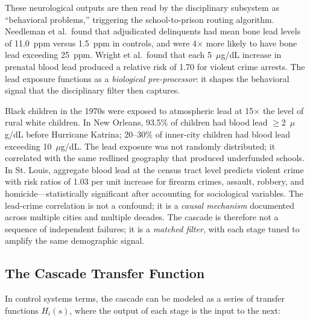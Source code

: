 These neurological outputs are then read by the disciplinary subsystem as ``behavioral problems,'' triggering the school-to-prison routing algorithm. Needleman et al.~found that adjudicated delinquents had mean bone lead levels of 11.0~ppm versus 1.5~ppm in controls, and were 4$\times$ more likely to have bone lead exceeding 25~ppm. Wright et al.~found that each 5~$\mu$g/dL increase in prenatal blood lead produced a relative risk of 1.70 for violent crime arrests. The lead exposure functions as a \textit{biological pre-processor}: it shapes the behavioral signal that the disciplinary filter then captures.

Black children in the 1970s were exposed to atmospheric lead at 15$\times$ the level of rural white children. In New Orleans, 93.5\% of children had blood lead $\geq$2~$\mu$g/dL before Hurricane Katrina; 20--30\% of inner-city children had blood lead exceeding 10~$\mu$g/dL. The lead exposure was not randomly distributed; it correlated with the same redlined geography that produced underfunded schools. In St. Louis, aggregate blood lead at the census tract level predicts violent crime with risk ratios of 1.03 per unit increase for firearm crimes, assault, robbery, and homicide---statistically significant after accounting for sociological variables. The lead-crime correlation is not a confound; it is a \textit{causal mechanism} documented across multiple cities and multiple decades. The cascade is therefore not a sequence of independent failures; it is a \textit{matched filter}, with each stage tuned to amplify the same demographic signal.

\subsection{The Cascade Transfer Function}

In control systems terms, the cascade can be modeled as a series of transfer functions $H_i(s)$, where the output of each stage is the input to the next:

